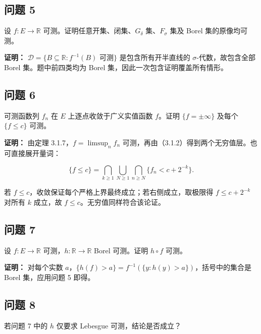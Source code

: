 \documentclass[11pt,a4paper]{article}
\begin{document}
\subsection{问题 5}\label{ux95eeux9898-5}

设 \(f:E\to\mathbb R\) 可测。证明任意开集、闭集、\(G_\delta\)
集、\(F_\sigma\) 集及 Borel 集的原像均可测。

\textbf{证明：}
\(\mathcal D=\{B\subseteq\mathbb R:f^{-1}(B)\text{ 可测}\}\)
是包含所有开半直线的 \(\sigma\)-代数，故包含全部 Borel
集。题中前四类均为 Borel 集，因此一次包含证明覆盖所有情形。

\subsection{问题 6}\label{ux95eeux9898-6}

可测函数列 \(f_n\) 在 \(E\) 上逐点收敛于广义实值函数 \(f\)。证明
\(\{f=\pm\infty\}\) 及每个 \(\{f\le c\}\) 可测。

\textbf{证明：} 由定理 3.1.7，\(f=\limsup_n f_n\)
可测，再由（3.1.2）得到两个无穷值层。也可直接展开量词：

\begin{equation*}
\{f\le c\}=\bigcap_{k\ge1}\bigcup_{N\ge1}\bigcap_{n\ge N}\{f_n<c+2^{-k}\}.
\tag{3.1.12}
\end{equation*}

若 \(f\le c\)，收敛保证每个严格上界最终成立；若右侧成立，取极限得
\(f\le c+2^{-k}\) 对所有 \(k\) 成立，故
\(f\le c\)。无穷值同样符合该论证。

\subsection{问题 7}\label{ux95eeux9898-7}

设 \(f:E\to\mathbb R\) 可测，\(h:\mathbb R\to\mathbb R\) Borel
可测。证明 \(h\circ f\) 可测。

\textbf{证明：} 对每个实数
\(a\)，\(\{h(f)>a\}=f^{-1}(\{y:h(y)>a\})\)，括号中的集合是 Borel
集，应用问题 5 即得。

\subsection{问题 8}\label{ux95eeux9898-8}

若问题 7 中的 \(h\) 仅要求 Lebesgue 可测，结论是否成立？
\end{document}
